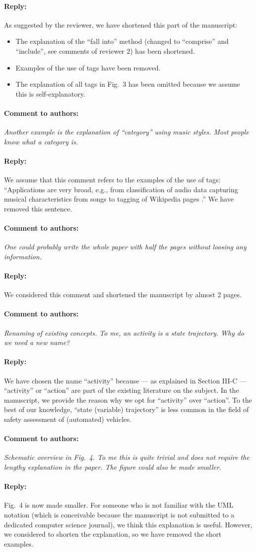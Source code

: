 \documentclass[10pt,final,a4paper,oneside,onecolumn]{article}
\newcommand{\toauthor}{\paragraph*{Comment to authors:} \itshape}
\newcommand{\fromauthor}{\paragraph*{Reply:} \normalfont}
\newcommand{\cstart}{\cbstart\color{red}}
\newcommand{\cend}{\cbend\color{black}}
\begin{document}
\fromauthor As suggested by the reviewer, we have shortened this part of the manuscript:
\begin{itemize}
	\item The explanation of the ``fall into'' method (changed to \cstart ``comprise'' \cend and \cstart ``include''\cend, see comments of reviewer 2) has been shortened.
	\item Examples of the use of tags have been removed.
	\item The explanation of all tags in Fig.~3 has been omitted because we assume this is self-explanatory.
\end{itemize}



\toauthor Another example is the explanation of ``category'' using music styles. Most people know what a category is.  

\fromauthor We assume that this comment refers to the examples of the use of tags: ``Applications are very broad, e.g., from classification of audio data \autocite{kong2017joint} capturing musical characteristics from songs \autocite{ellis2011semantic} to tagging of Wikipedia pages \autocite{voss2006collaborative}.'' We have removed this sentence.



\toauthor One could probably write the whole paper with half the pages without loosing any information.

\fromauthor We considered this comment and shortened the manuscript by almost 2 pages.



\toauthor Renaming of existing concepts. To me, an activity is a state trajectory. Why do we need a new name?

\fromauthor We have chosen the name ``activity'' because --- as explained in Section III-C --- ``activity'' \autocite{elrofai2018scenario,catapult2018musicc} or ``action'' \autocite{ulbrich2015} are part of the existing literature on the subject. In the manuscript, we provide the reason why we opt for ``activity'' over ``action''. To the best of our knowledge, ``state (variable) trajectory'' is less common in the field of safety assessment of (automated) vehicles.



\toauthor Schematic overview in Fig.~4. To me this is quite trivial and does not require the lengthy explanation in the paper. The figure could also be made smaller.

\fromauthor Fig.~4 is now made smaller. For someone who is not familiar with the UML notation (which is conceivable because the manuscript is not submitted to a dedicated computer science journal), we think this explanation is useful. However, we considered to shorten the explanation, so we have removed the short examples.
\end{document}
